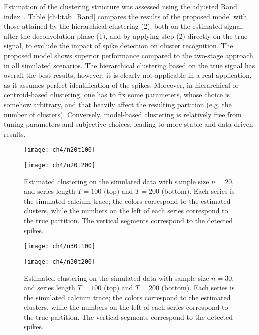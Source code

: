Estimation of the clustering structure was assessed using the adjusted Rand index~\parencite{rand1971,hubert1985}. Table \ref{ch4:tab_Rand} compares the results of the proposed model with those attained by the hierarchical clustering (2), both on the estimated signal, after the deconvolution phase (1), and by applying step (2) directly on the true signal, to exclude the impact of spike detection on cluster recognition. The proposed model shows superior performance compared to the two-stage approach in all simulated scenarios. The hierarchical clustering based on the true signal has overall the best results, however, it is clearly not applicable in a real application, as it assumes perfect identification of the spikes.
Moreover, in hierarchical or centroid-based clustering, one has to fix some parameters, whose choice is somehow arbitrary, and that heavily affect the resulting partition (e.g. the number of clusters). Conversely, model-based clustering is relatively free from tuning parameters and subjective choices, leading to more stable and data-driven results.

\begin{figure}
	\centering
	\texttt{[image: ch4/n20t100]}\\
	\centerline{
		\texttt{[image: ch4/n20t200]}
	}
	\label{ch4:fig_n20}
	\caption[Estimated clustering on the simulated data with sample size $n=20$.]{Estimated clustering on the simulated data with sample size $n=20$, and series length $T=100$ (top) and $T=200$ (bottom). Each series is the simulated calcium trace; the colors correspond to the estimated clusters, while the numbers on the left of each series correspond to the true partition. The vertical segments correspond to the detected spikes.}
\end{figure}

\begin{figure}
	\centering
	\texttt{[image: ch4/n30t100]}\\
	\centerline{
		\texttt{[image: ch4/n30t200]}
	}
	\label{ch4:fig_n30}
	\caption[Estimated clustering on the simulated data with sample size $n=30$.]{Estimated clustering on the simulated data with sample size $n=30$, and series length $T=100$ (top) and $T=200$ (bottom). Each series is the simulated calcium trace; the colors correspond to the estimated clusters, while the numbers on the left of each series correspond to the true partition. The vertical segments correspond to the detected spikes.}
\end{figure}

